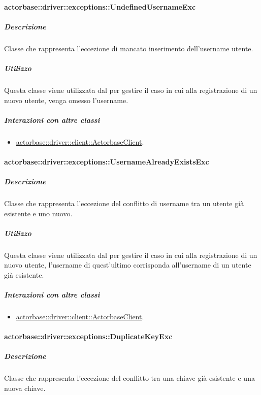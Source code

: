 \documentclass{scalatekids-article}
\begin{document}
\paragraph{actorbase::driver::exceptions::UndefinedUsernameExc}

\subparagraph{Descrizione}

Classe che rappresenta l'eccezione di mancato inserimento dell'username utente.

\subparagraph{Utilizzo}

Questa classe viene utilizzata dal  per gestire il caso in cui alla registrazione di un nuovo utente, venga omesso l'username.

\subparagraph{Interazioni con altre classi}

\begin{itemize}
	\item \hyperref[sec:actorbase::driver::client::ActorbaseClient]{actorbase::driver::client::ActorbaseClient}.
\end{itemize}

\paragraph{actorbase::driver::exceptions::UsernameAlreadyExistsExc}

\subparagraph{Descrizione}

Classe che rappresenta l'eccezione del conflitto di username tra un utente già esistente e uno nuovo.

\subparagraph{Utilizzo}

Questa classe viene utilizzata dal  per gestire il caso in cui alla registrazione di un nuovo utente, l'username di quest'ultimo corrisponda all'username di un utente già esistente.

\subparagraph{Interazioni con altre classi}

\begin{itemize}
	\item \hyperref[sec:actorbase::driver::client::ActorbaseClient]{actorbase::driver::client::ActorbaseClient}.
\end{itemize}

\paragraph{actorbase::driver::exceptions::DuplicateKeyExc}

\subparagraph{Descrizione}

Classe che rappresenta l'eccezione del conflitto tra una chiave già esistente e una nuova chiave.
\end{document}
